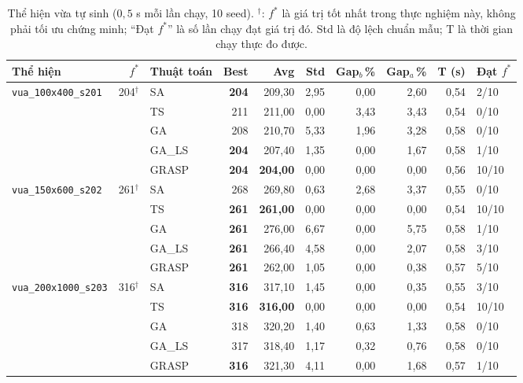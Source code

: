 \documentclass[a4paper,12pt]{article}
\begin{document}
\begin{table}[htbp]
\centering
\caption{Thể hiện vừa tự sinh ($0{,}5$ s mỗi lần chạy, 10 seed). $^\dagger$: $f^*$ là giá trị tốt nhất trong thực nghiệm này, không phải tối ưu chứng minh; ``Đạt $f^*$'' là số lần chạy đạt giá trị đó. Std là độ lệch chuẩn mẫu; T là thời gian chạy thực đo được.}
\footnotesize
\setlength{\tabcolsep}{3pt}
\begin{tabularx}{\textwidth}{lrlrrrrrrY}
\toprule
Thể hiện & $f^*$ & Thuật toán & Best & Avg & Std & Gap$_b$\,\% & Gap$_a$\,\% & T (s) & Đạt $f^*$\\
\midrule
\texttt{vua\_100x400\_s201} & 204$^{\dagger}$ & SA & \textbf{204} & 209{,}30 & 2{,}95 & 0{,}00 & 2{,}60 & 0{,}54 & 2/10\\
 &  & TS & 211 & 211{,}00 & 0{,}00 & 3{,}43 & 3{,}43 & 0{,}54 & 0/10\\
 &  & GA & 208 & 210{,}70 & 5{,}33 & 1{,}96 & 3{,}28 & 0{,}58 & 0/10\\
 &  & GA\_LS & \textbf{204} & 207{,}40 & 1{,}35 & 0{,}00 & 1{,}67 & 0{,}58 & 1/10\\
 &  & GRASP & \textbf{204} & \textbf{204{,}00} & 0{,}00 & 0{,}00 & 0{,}00 & 0{,}56 & 10/10\\
\midrule
\texttt{vua\_150x600\_s202} & 261$^{\dagger}$ & SA & 268 & 269{,}80 & 0{,}63 & 2{,}68 & 3{,}37 & 0{,}55 & 0/10\\
 &  & TS & \textbf{261} & \textbf{261{,}00} & 0{,}00 & 0{,}00 & 0{,}00 & 0{,}54 & 10/10\\
 &  & GA & \textbf{261} & 276{,}00 & 6{,}67 & 0{,}00 & 5{,}75 & 0{,}58 & 1/10\\
 &  & GA\_LS & \textbf{261} & 266{,}40 & 4{,}58 & 0{,}00 & 2{,}07 & 0{,}58 & 3/10\\
 &  & GRASP & \textbf{261} & 262{,}00 & 1{,}05 & 0{,}00 & 0{,}38 & 0{,}57 & 5/10\\
\midrule
\texttt{vua\_200x1000\_s203} & 316$^{\dagger}$ & SA & \textbf{316} & 317{,}10 & 1{,}45 & 0{,}00 & 0{,}35 & 0{,}55 & 3/10\\
 &  & TS & \textbf{316} & \textbf{316{,}00} & 0{,}00 & 0{,}00 & 0{,}00 & 0{,}54 & 10/10\\
 &  & GA & 318 & 320{,}20 & 1{,}40 & 0{,}63 & 1{,}33 & 0{,}58 & 0/10\\
 &  & GA\_LS & 317 & 318{,}40 & 1{,}17 & 0{,}32 & 0{,}76 & 0{,}58 & 0/10\\
 &  & GRASP & \textbf{316} & 321{,}30 & 4{,}11 & 0{,}00 & 1{,}68 & 0{,}57 & 1/10\\
\bottomrule
\end{tabularx}
\label{tbl:meta_mid}
\end{table}
\end{document}
